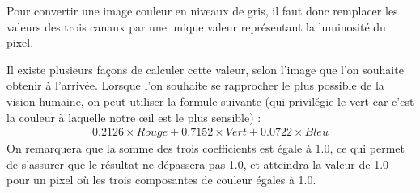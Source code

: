 \documentclass[letterpaper,10pt,english]{jupyterBook}
\begin{document}
\sphinxAtStartPar
Pour convertir une image couleur en niveaux de gris, il faut donc remplacer les valeurs
des trois canaux par une unique valeur représentant la luminosité du pixel.

\sphinxAtStartPar
Il existe plusieurs façons de calculer cette valeur, selon l’image que l’on souhaite obtenir à l’arrivée. Lorsque l’on souhaite se rapprocher le plus possible de la vision humaine, on peut utiliser la formule suivante (qui privilégie le vert car c’est la couleur à laquelle notre œil est le plus sensible) :
\begin{equation*}
\begin{split}0.2126 × Rouge + 0.7152 × Vert + 0.0722 × Bleu\end{split}
\end{equation*}
\sphinxAtStartPar
On remarquera que la somme des trois coefficients est égale à 1.0, ce qui permet de
s’assurer que le résultat ne dépassera pas 1.0, et atteindra la valeur de 1.0 pour un pixel où les trois composantes de couleur égales à 1.0.
\end{document}

